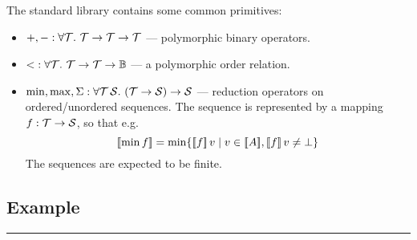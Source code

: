 The standard library contains some common primitives:

\begin{itemize}
  \item ${+}, {-} : \forall \mathcal{T}.~\mathcal{T}\to\mathcal{T}\to\mathcal{T}$ --- polymorphic binary operators.
  \item ${<} : \forall \mathcal{T}. ~\mathcal{T}\to\mathcal{T}\to\mathbb{B}$ --- a polymorphic order relation.
  \item $\min, \max, \Sigma : \forall \mathcal{T}\,\mathcal{S}.~ (\mathcal{T}\to\mathcal{S})\to\mathcal{S}$ --- reduction operators
    on ordered/unordered sequences. The sequence is represented by a mapping $f : \mathcal{T}\to\mathcal{S}$,
    so that e.g. \[\semp{\min f} = \min \{\semp{f}\,v \;|\; v\in\semp{A}, \semp{f}\,v\neq\bot\}\]
    The sequences are expected to be finite.
\end{itemize}

\subsection{Example \hrulefill}
\hrule
\bigskip

